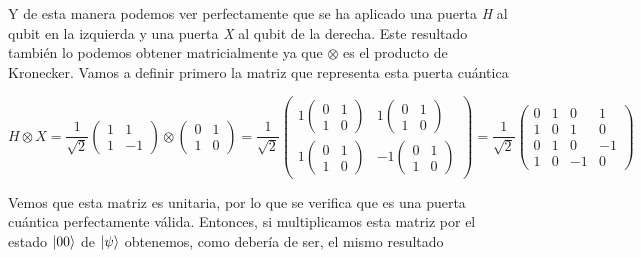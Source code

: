 \documentclass{article}
\numberwithin{equation}{section} %
\begin{document}
    \vspace{2.5mm}

    Y de esta manera podemos ver perfectamente que se ha aplicado una puerta \textit{H} al qubit en la izquierda y una puerta \textit{X} al qubit de la derecha. Este resultado también lo podemos obtener matricialmente ya que \( \otimes \) es el producto de Kronecker. Vamos a definir primero la matriz que representa esta puerta cuántica

    \begin{equation*}
        H \otimes X = \frac{1}{\sqrt{2}} \begin{pmatrix}
            1 & 1 \\
            1 & -1 
        \end{pmatrix} \otimes \begin{pmatrix}
            0 & 1 \\
            1 & 0 
        \end{pmatrix} = \frac{1}{\sqrt{2}} \begin{pmatrix}
            1 \begin{pmatrix} 0 & 1 \\ 1 & 0 \end{pmatrix} & 1 \begin{pmatrix} 0 & 1 \\ 1 & 0 \end{pmatrix} \\  
            1 \begin{pmatrix} 0 & 1 \\ 1 & 0 \end{pmatrix} & -1 \begin{pmatrix} 0 & 1 \\ 1 & 0 \end{pmatrix}
        \end{pmatrix} = \frac{1}{\sqrt{2}} \begin{pmatrix}
            0 & 1 & 0 & 1 \\
            1 & 0 & 1 & 0 \\
            0 & 1 & 0 & -1 \\
            1 & 0 & -1 & 0
        \end{pmatrix}
    \end{equation*}

    \vspace{2.5mm}

    Vemos que esta matriz es unitaria, por lo que se verifica que es una puerta cuántica perfectamente válida. Entonces, si multiplicamos esta matriz por el estado \( \ket{0 0} \) de \( \ket{\psi} \) obtenemos, como debería de ser, el mismo resultado
\end{document}

